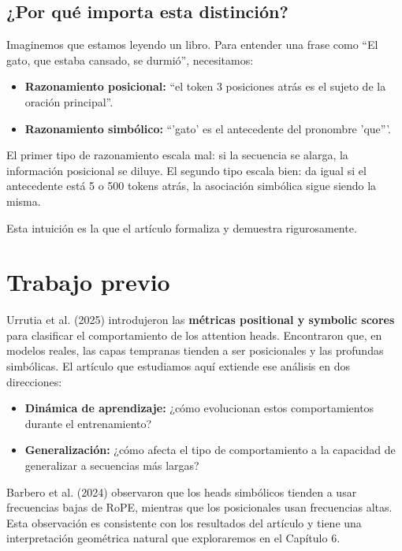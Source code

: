 \documentclass[12pt,a4paper,oneside]{report}
\begin{document}
\subsection{¿Por qué importa esta distinción?}

Imaginemos que estamos leyendo un libro. Para entender una frase como ``El gato, que estaba cansado, se durmió'', necesitamos:
\begin{itemize}
    \item \textbf{Razonamiento posicional:} ``el token 3 posiciones atrás es el sujeto de la oración principal''.
    \item \textbf{Razonamiento simbólico:} ``'gato' es el antecedente del pronombre 'que'''.
\end{itemize}

El primer tipo de razonamiento escala mal: si la secuencia se alarga, la información posicional se diluye. El segundo tipo escala bien: da igual si el antecedente está 5 o 500 tokens atrás, la asociación simbólica sigue siendo la misma.

Esta intuición es la que el artículo formaliza y demuestra rigurosamente.

\section{Trabajo previo}

Urrutia et al. (2025) introdujeron las \textbf{métricas positional y symbolic scores} para clasificar el comportamiento de los attention heads. Encontraron que, en modelos reales, las capas tempranas tienden a ser posicionales y las profundas simbólicas. El artículo que estudiamos aquí extiende ese análisis en dos direcciones:

\begin{itemize}
    \item \textbf{Dinámica de aprendizaje:} ¿cómo evolucionan estos comportamientos durante el entrenamiento?
    \item \textbf{Generalización:} ¿cómo afecta el tipo de comportamiento a la capacidad de generalizar a secuencias más largas?
\end{itemize}

Barbero et al. (2024) observaron que los heads simbólicos tienden a usar frecuencias bajas de RoPE, mientras que los posicionales usan frecuencias altas. Esta observación es consistente con los resultados del artículo y tiene una interpretación geométrica natural que exploraremos en el Capítulo 6.
\end{document}
